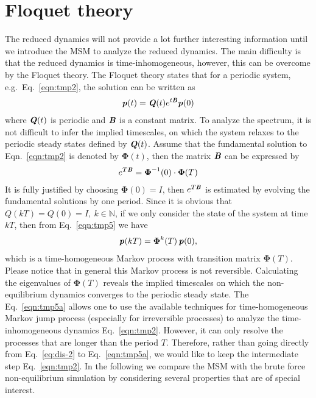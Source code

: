 \documentclass[aps, pre, preprint,unsortedaddress,a4paper,onecolumn]{revtex4}
\newcommand{\vect}[1]{\textbf{\textit{#1}}}
\begin{document}




\section{Floquet theory}

The reduced dynamics will not provide a lot further interesting
information until we introduce the MSM to analyze the reduced dynamics. The main
difficulty is that the reduced dynamics is time-inhomogeneous, however, this can
be overcome by the Floquet theory.
The Floquet theory states that for a periodic system, e.g.~Eq.~\eqref{eqn:tmp2}, the solution can be written as
\begin{align}
  \label{eqn:tmp5}
  \vect p(t)  = \vect Q(t) e^{t\vect B} \vect p(0)
\end{align}
where $\vect Q(t)$ is periodic and $\vect B$ is a constant matrix.  To
analyze the spectrum, it is not difficult to infer the implied
timescales, on which the system relaxes to the periodic steady states
defined by $\vect Q(t)$.
Assume that the fundamental solution to Eqn.~\ref{eqn:tmp2} is denoted by $\boldsymbol \Phi(t)$, then
the matrix $\vect B$ can be expressed by
\begin{align}
  e^{T\vect B} = \boldsymbol \Phi^{-1}(0)\cdot \boldsymbol \Phi(T)
\end{align}
It is fully justified by choosing $ \boldsymbol \Phi(0) = I$, then
$e^{T\vect B}$ is estimated by evolving the fundamental solutions by
one period.
Since it is obvious that $Q(kT) = Q(0) = I,\ k\in\mathbb N$, if we only consider the state of the system
at time $kT$, then from Eq.~\eqref{eqn:tmp5} we have
\begin{align}
  \label{eqn:tmp5a}
  \vect p(kT)  = \boldsymbol\Phi^k(T) \,\vect p(0),
\end{align}
which is a time-homogeneous Markov process with transition matrix $\boldsymbol\Phi(T)$.
Please notice that in general this Markov process is not reversible.
Calculating the eigenvalues of $\boldsymbol\Phi(T)$ reveals the
implied timescales on which the non-equilibrium dynamics converges to
the periodic steady state.
The Eq.~\eqref{eqn:tmp5a} allows one to use the available techniques for time-homogeneous
Markov jump process (especially for irreversible processes)
to analyze the time-inhomogeneous dynamics Eq.~\eqref{eqn:tmp2}.
However, it can only resolve the processes that are longer than the period $T$.
Therefore, rather than going directly from Eq.~\eqref{eq:dis-2} to Eq.~\eqref{eqn:tmp5a},
we would like to keep the intermediate step Eq.~\eqref{eqn:tmp2}.
In the following we compare the MSM with the brute force non-equilibrium simulation
by considering several properties that are of special interest.
\end{document}
